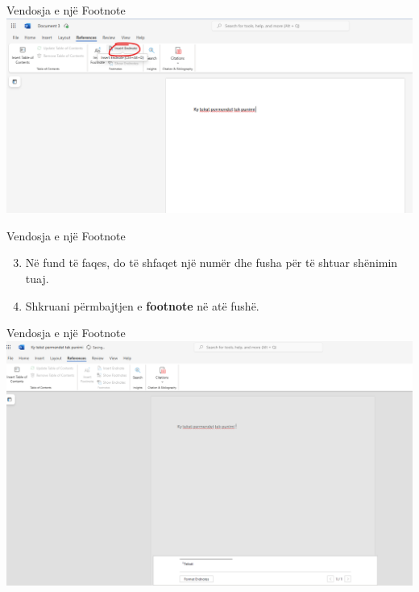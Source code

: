 \documentclass[
  ignorenonframetext,
]{beamer}
\begin{document}
\begin{frame}{Vendosja e një Footnote}
\label{vendosja-e-njuxeb-footnote-1}
\includegraphics{./images/word13.png}
\end{frame}

\begin{frame}{Vendosja e një Footnote}
\label{vendosja-e-njuxeb-footnote-2}
\begin{enumerate}
\setcounter{enumi}{2}
\item
  Në fund të faqes, do të shfaqet një numër dhe fusha për të shtuar
  shënimin tuaj.
\item
  Shkruani përmbajtjen e \textbf{footnote} në atë fushë.
\end{enumerate}
\end{frame}

\begin{frame}{Vendosja e një Footnote}
\label{vendosja-e-njuxeb-footnote-3}
\includegraphics{./images/word14.png}
\end{frame}
\end{document}

